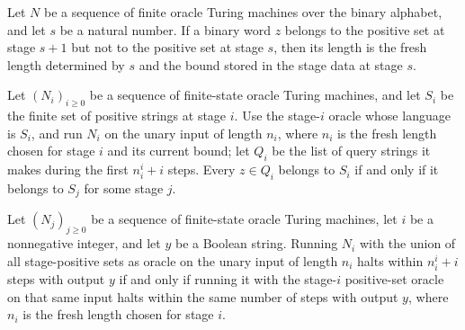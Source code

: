 \begin{theorem}
\label{Complexity.entry_length}
\leanok
{}
Let $N$ be a sequence of finite oracle Turing machines over the binary alphabet, and let
$s$ be a natural number. If a binary word $z$ belongs to the positive set at stage $s+1$
but not to the positive set at stage $s$, then its length is the fresh length determined
by $s$ and the bound stored in the stage data at stage $s$.
\end{theorem}

\begin{theorem}
\label{Complexity.stage_consistent}
\leanok
{}
Let $(N_i)_{i\ge 0}$ be a sequence of finite-state oracle Turing machines, and let $S_i$
be the finite set of positive strings at stage $i$. Use the stage-$i$ oracle whose
language is $S_i$, and run $N_i$ on the unary input of length $n_i$, where $n_i$ is the
fresh length chosen for stage $i$ and its current bound; let $Q_i$ be the list of query
strings it makes during the first $n_i^i+i$ steps. Every $z\in Q_i$ belongs to $S_i$ if
and only if it belongs to $S_j$ for some stage $j$.
\end{theorem}

\begin{theorem}
\label{Complexity.stage_transfer}
\leanok
{}
Let $(N_j)_{j\ge0}$ be a sequence of finite-state oracle Turing machines, let $i$ be a
nonnegative integer, and let $y$ be a Boolean string. Running $N_i$ with the union of
all stage-positive sets as oracle on the unary input of length $n_i$ halts within
$n_i^i+i$ steps with output $y$ if and only if running it with the stage-$i$
positive-set oracle on that same input halts within the same number of steps with output
$y$, where $n_i$ is the fresh length chosen for stage $i$.
\end{theorem}


